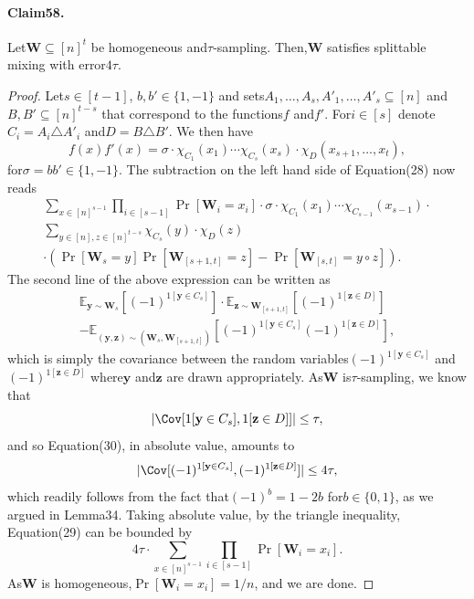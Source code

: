 \paragraph{Claim58.} Let$\mathbf W\subseteq[n]^t$ be homogeneous and$\tau$-sampling. Then,$\mathbf W$ satisfies splittable mixing with error$4\tau$.
\begin{proof}
Let$s\in[t-1]$, $b,b'\in\{1,-1\}$ and sets$A_1,\ldots,A_s,A'_1,\ldots,A'_s\subseteq[n]$ and$B,B'\subseteq[n]^{t-s}$ that correspond to the functions$f$ and$f'$. For$i\in[s]$ denote$C_i=A_i\triangle A'_i$ and$D=B\triangle B'$. We then have
\[f(x)f'(x)=\sigma\cdot\chi_{C_1}(x_1)\cdots\chi_{C_s}(x_s)\cdot\chi_D(x_{s+1},\ldots,x_t),\]
for$\sigma=bb'\in\{1,-1\}$. The subtraction on the left hand side of Equation(28) now reads
\begin{multline*}
\sum_{x\in[n]^{s-1}}\prod_{i\in[s-1]}\Pr[\mathbf W_i=x_i]\cdot\sigma\cdot\chi_{C_1}(x_1)\cdots\chi_{C_{s-1}}(x_{s-1})\cdot\\
\sum_{y\in[n],z\in[n]^{t-s}}\chi_{C_s}(y)\cdot\chi_D(z)\\
\cdot(\Pr[\mathbf W_s=y]\Pr[\mathbf W_{[s+1,t]}=z]-\Pr[\mathbf W_{[s,t]}=y\circ z]).\tag{29}
\end{multline*}
The second line of the above expression can be written as
\begin{multline*}
\mathbb E_{\mathbf y\sim\mathbf W_s}[(-1)^{1[\mathbf y\in C_s]}]\cdot\mathbb E_{\mathbf z\sim\mathbf W_{[s+1,t]}}[(-1)^{1[\mathbf z\in D]}]\\
-\mathbb E_{(\mathbf y,\mathbf z)\sim(\mathbf W_s,\mathbf W_{[s+1,t]})}[(-1)^{1[\mathbf y\in C_s]}(-1)^{1[\mathbf z\in D]}],\tag{30}
\end{multline*}
which is simply the covariance between the random variables$(-1)^{1[\mathbf y\in C_s]}$ and$(-1)^{1[\mathbf z\in D]}$ where$\mathbf y$ and$\mathbf z$ are drawn appropriately. As$\mathbf W$ is$\tau$-sampling, we know that
\[|\Cov[1[\mathbf y\in C_s],1[\mathbf z\in D]]|\leq\tau,\]
and so Equation(30), in absolute value, amounts to
\[|\Cov[(-1)^{1[\mathbf y\in C_s]},(-1)^{1[\mathbf z\in D]}]|\leq4\tau,\]
which readily follows from the fact that$(-1)^b=1-2b$ for$b\in\{0,1\}$, as we argued in Lemma34. Taking absolute value, by the triangle inequality, Equation(29) can be bounded by
\[4\tau\cdot\sum_{x\in[n]^{s-1}}\prod_{i\in[s-1]}\Pr[\mathbf W_i=x_i].\]
As$\mathbf W$ is homogeneous,$\Pr[\mathbf W_i=x_i]=1/n$, and we are done.
\end{proof}
